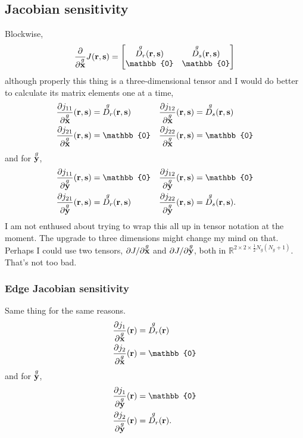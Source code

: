 \subsection{Jacobian sensitivity}

Blockwise,
%
\begin{equation}
\pp{}{\g{\ve x}} J(\ve r, \ve s) = 
\begin{bmatrix}
\g{D_r}(\ve r, \ve s) & \g{D_s}(\ve r, \ve s)
\\ \mathbb{0} & \mathbb{0}
\end{bmatrix}
\end{equation}
%
although properly this thing is a three-dimensional tensor and I would do better to calculate its matrix elements one at a time,
%
\begin{equation}
\begin{aligned}
\pp{j_{11}}{\g{\ve x}}(\ve r, \ve s) &= \g{D_r}(\ve r, \ve s) &\pp{j_{12}}{\g{\ve x}}(\ve r, \ve s) &= \g{D_s}(\ve r, \ve s) \\
\pp{j_{21}}{\g{\ve x}}(\ve r, \ve s) &= \mathbb{0} &\pp{j_{22}}{\g{\ve x}}(\ve r, \ve s) &= \mathbb{0}
\end{aligned}
\end{equation}
%
and for $\overset{g}{\textbf{y}}$,
%
\begin{equation}
\begin{aligned}
\pp{j_{11}}{\g{\ve y}}(\ve r, \ve s) &= \mathbb{0} &\pp{j_{12}}{\g{\ve y}}(\ve r, \ve s) &= \mathbb{0} \\
\pp{j_{21}}{\g{\ve y}}(\ve r, \ve s) &= \g{D_r}(\ve r, \ve s) &\pp{j_{22}}{\g{\ve y}}(\ve r, \ve s) &= \g{D_s}(\ve r, \ve s).
\end{aligned}
\end{equation}
%
I am not enthused about trying to wrap this all up in tensor notation at the moment.  The upgrade to three dimensions might change my mind on that.  Perhaps I could use two tensors, $\partial{J}/\partial{\overset{g}{\textbf{x}}}$ and $\partial{J}/\partial{\overset{g}{\textbf{y}}}$, both in $\mathbb{R}^{2 \times 2 \times \frac{1}{2}N_g(N_g+1)}$.  That's not too bad.

\subsubsection{Edge Jacobian sensitivity}

Same thing for the same reasons.
%
\begin{equation}
\label{eqn:edge_jacobian_sensitivity_x}
\begin{aligned}
\pp{j_{1}}{\g{\ve x}}(\ve r) &= \g{D_r}(\ve r) \\
\pp{j_{2}}{\g{\ve x}}(\ve r) &= \mathbb{0}
\end{aligned}
\end{equation}
%
and for $\overset{g}{\textbf{y}}$,
%
\begin{equation}
\label{eqn:edge_jacobian_sensitivity_y}
\begin{aligned}
\pp{j_{1}}{\g{\ve y}}(\ve r) &= \mathbb{0} \\
\pp{j_{2}}{\g{\ve y}}(\ve r) &= \g{D_r}(\ve r).
\end{aligned}
\end{equation}
%


